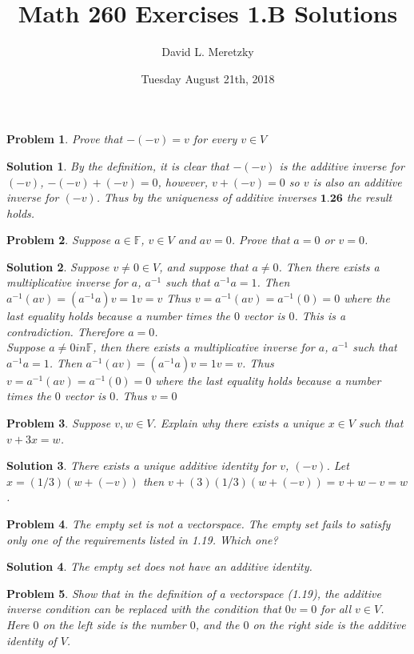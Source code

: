 \documentclass{article}
\title{ \vspace{-10ex} %
Math 260 Exercises 1.B Solutions
}
\author{David L. Meretzky
}
\date{%
Tuesday August 21th, 2018
}
\theoremstyle{problemstyle}
\newtheorem{problem}{Problem}
\theoremstyle{problemstyle}
\newtheorem{solution}{Solution}
\begin{document}
\maketitle

\begin{problem}
Prove that $-(-v) = v$ for every $v \in V$ 
\end{problem}

\begin{solution}
By the definition, it is clear that $-(-v)$ is the additive inverse for $(-v)$, $-(-v) + (-v) = 0$, however, $v + (-v) = 0$ so $v$ is also an additive inverse for $(-v)$. Thus by the uniqueness of additive inverses $\textbf{1.26}$ the result holds.
\end{solution}

\begin{problem}
Suppose $a \in \mathbb{F}$, $v \in V$ and $av = 0$. Prove that $a = 0$ or $v = 0$. 
\end{problem}

\begin{solution}
Suppose $v \neq 0 \in V$, and suppose that $a \neq 0$. Then there exists a multiplicative inverse for $a$, $a^{-1}$ such that $a^{-1}a = 1$. Then $a^{-1}(av) = (a^{-1}a)v = 1v = v$ Thus $v = a^{-1}(av) = a^{-1}(0) = 0$ where the last equality holds because a number times the $0$ vector is $0$. This is a contradiction. Therefore $a = 0$.\\
Suppose $a \neq 0 in \mathbb{F}$, then there exists a multiplicative inverse for $a$, $a^{-1}$ such that $a^{-1}a = 1$. Then $a^{-1}(av) = (a^{-1}a)v = 1v = v$. Thus $v = a^{-1}(av) = a^{-1}(0) = 0$ where the last equality holds because a number times the $0$ vector is $0$. Thus $v = 0$ 
\end{solution}

\begin{problem}
Suppose $v,w \in V$. Explain why there exists a unique $x \in V$ such that $v + 3x = w$.
\end{problem}
\begin{solution}
There exists a unique additive identity for $v$, $(-v)$. Let $x = (1/3)(w+(-v))$ then $v + (3)(1/3)(w+(-v)) = v + w -v = w$.
\end{solution}

\begin{problem}
The empty set is not a vectorspace. The empty set fails to satisfy only one of the requirements listed in 1.19. Which one?
\end{problem}
\begin{solution}
The empty set does not have an additive identity. 
\end{solution}
\begin{problem}
Show that in the definition of a vectorspace (1.19), the additive inverse condition can be replaced with the condition that $0v = 0$ for all $v \in V$. Here $0$ on the left side is the number $0$, and the $0$ on the right side is the additive identity of $V$. 
\end{problem}
\end{document}

